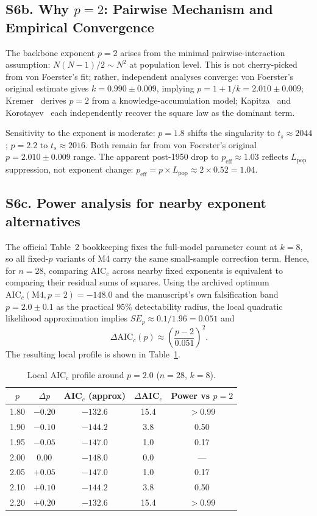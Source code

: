 \documentclass[11pt]{article}
\begin{document}
\subsection*{S6b. Why $p=2$: Pairwise Mechanism and Empirical Convergence}

The backbone exponent $p=2$ arises from the minimal pairwise-interaction assumption:
$N(N-1)/2 \sim N^2$ at population level.
This is not cherry-picked from von Foerster's fit; rather, independent analyses converge:
von Foerster's original estimate gives $k=0.990\pm 0.009$, implying $p=1+1/k=2.010\pm 0.009$;
Kremer~\cite{kremer1993} derives $p=2$ from a knowledge-accumulation model;
Kapitza~\cite{kapitza1996} and Korotayev~\cite{korotayev2006} each independently recover the square law
as the dominant term.

Sensitivity to the exponent is moderate:
$p=1.8$ shifts the singularity to $t_s\approx 2044$; $p=2.2$ to $t_s\approx 2016$.
Both remain far from von Foerster's original $p=2.010\pm 0.009$ range.
The apparent post-1950 drop to $p_{\mathrm{eff}}\approx 1.03$ reflects $L_{\mathrm{pop}}$ suppression,
not exponent change: $p_{\mathrm{eff}}=p\times L_{\mathrm{pop}}\approx 2\times 0.52=1.04$.

\subsection*{S6c. Power analysis for nearby exponent alternatives}
The official Table~2 bookkeeping fixes the full-model parameter count at
$k=8$, so all fixed-$p$ variants of M4 carry the same small-sample
correction term. Hence, for $n=28$, comparing AIC$_c$ across nearby
fixed exponents is equivalent to comparing their residual sums of squares.
Using the archived optimum $\mathrm{AIC}_c(\mathrm{M4},p=2)=-148.0$ and
the manuscript's own falsification band $p=2.0\pm0.1$ as the practical
95\% detectability radius, the local quadratic likelihood approximation
implies $SE_p\approx 0.1/1.96=0.051$ and
\[
\Delta \mathrm{AIC}_c(p)\approx \left(\frac{p-2}{0.051}\right)^2.
\]
The resulting local profile is shown in Table~\ref{tab:S6_power_p}.

\begin{table}[h]
\centering
\caption{Local AIC$_c$ profile around $p=2.0$ ($n=28$, $k=8$).}
\label{tab:S6_power_p}
\begin{tabular}{ccccc}
\hline
$p$ & $\Delta p$ & AIC$_c$ (approx) & $\Delta$AIC$_c$ & Power vs $p=2$ \\
\hline
1.80 & $-0.20$ & $-132.6$ & 15.4 & $>$0.99 \\
1.90 & $-0.10$ & $-144.2$ &  3.8 & 0.50 \\
1.95 & $-0.05$ & $-147.0$ &  1.0 & 0.17 \\
2.00 &   0.00  & $-148.0$ &  0.0 & --- \\
2.05 & $+0.05$ & $-147.0$ &  1.0 & 0.17 \\
2.10 & $+0.10$ & $-144.2$ &  3.8 & 0.50 \\
2.20 & $+0.20$ & $-132.6$ & 15.4 & $>$0.99 \\
\hline
\end{tabular}
\end{table}
\end{document}

